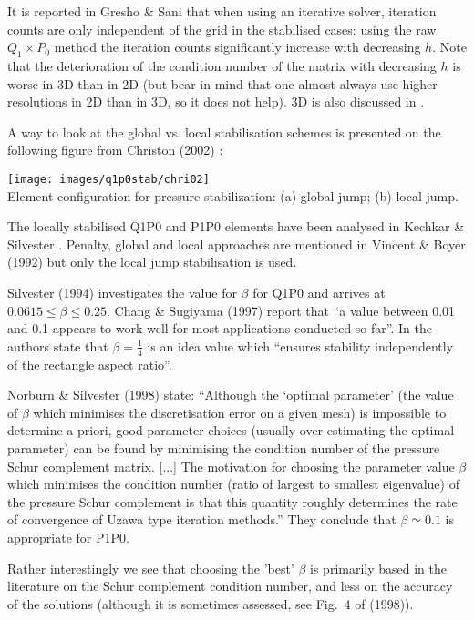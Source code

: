It is reported in Gresho \& Sani \cite{grsa} that when using an iterative solver, iteration counts
are only independent of the grid in the stabilised cases: using the raw $Q_1\times P_0$ method the iteration counts significantly increase with decreasing $h$. Note that the deterioration of the condition number of the matrix with decreasing $h$ is worse in 3D than in 2D (but
bear in mind that one almost always use higher resolutions in 2D than in 3D, so it does not help). 3D is also discussed in \cite{chsu97}.

A way to look at the global vs. local stabilisation schemes is presented
on the following figure from Christon (2002) \cite{chri02}:

\begin{center}
\texttt{[image: images/q1p0stab/chri02]}\\
{\captionfont Element configuration for pressure stabilization: (a) global jump; (b) local jump.}
\end{center}

\begin{remark}
The locally stabilised Q1P0 and P1P0 elements have been analysed in Kechkar \& Silvester \cite{kesi92}. Penalty, global and local approaches are mentioned in Vincent \& Boyer (1992) but only the local jump
stabilisation is used. 
\end{remark}

Silvester (1994) investigates the value for $\beta$ for Q1P0 and 
arrives at $0.0615 \leq \beta \le 0.25$.
Chang \& Sugiyama (1997) report that ``a value between 0.01 and 0.1 appears to work well for most applications conducted so far''.
In \cite{elsw} the authors state that $\beta=\frac14$ is an idea value which ``ensures stability independently of the rectangle aspect ratio''.

Norburn \& Silvester (1998) state: ``Although the ‘optimal parameter’ (the value of $\beta$ which minimises the discretisation error on a given mesh) is impossible to determine a priori, good parameter choices (usually over-estimating the optimal parameter) can be
found by minimising the condition number of the pressure Schur complement matrix. [...]
The motivation for choosing the parameter value $\beta$ which minimises the condition number (ratio of largest to smallest eigenvalue) of the pressure Schur complement is that this quantity roughly determines the rate of convergence of Uzawa type iteration methods.'' They conclude that $\beta \simeq 0.1$ is appropriate for P1P0.

Rather interestingly we see that choosing the 'best' $\beta$ is primarily based in the literature on the Schur complement condition number, and less on the accuracy of the solutions (although it is sometimes assessed, see Fig.~4 of \textcite{nosi98} (1998)). 


